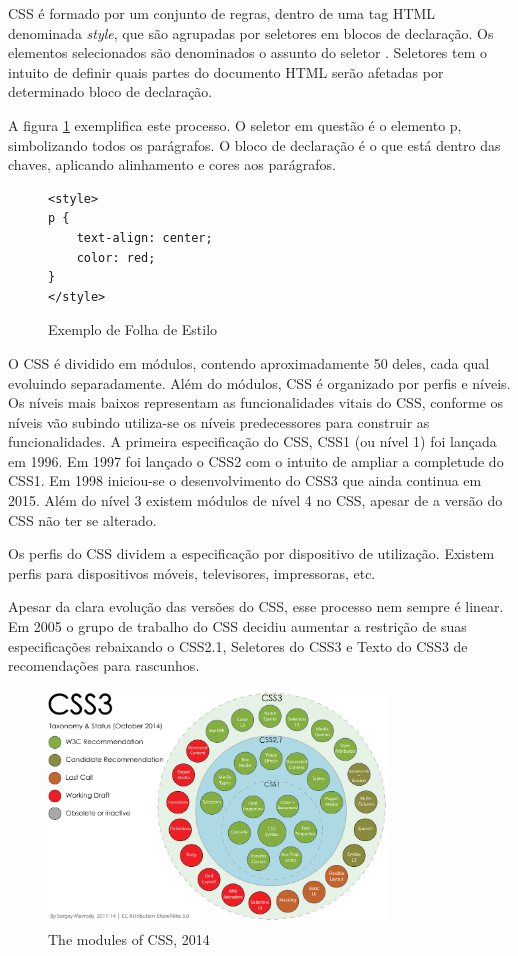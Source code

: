 \documentclass[
12pt,
a4paper,
portuges,
draft
]{report}
\begin{document}
CSS é formado por um conjunto de regras,
dentro de uma tag HTML denominada \textit{style}, que são agrupadas
por seletores em blocos de declaração. Os elementos selecionados são
denominados o assunto do seletor \autocite{cssSelectors}. Seletores tem
o intuito de definir quais partes do documento HTML serão afetadas por
determinado bloco de declaração.

A figura \ref{fig:CSSSample} exemplifica este processo. O seletor em
questão é o elemento p, simbolizando todos os parágrafos. O bloco de declaração
é o que está dentro das chaves, aplicando alinhamento e cores aos parágrafos.

\begin{figure}
\centering
\begin{verbatim}
<style>
p {
    text-align: center;
    color: red;
}
</style>
\end{verbatim}
\caption{Exemplo de Folha de Estilo}
\label{fig:CSSSample}
\end{figure}

O CSS é dividido em módulos, contendo aproximadamente 50 deles, cada
qual evoluindo separadamente. Além do módulos, CSS é organizado por perfis e níveis.
Os níveis mais baixos representam as funcionalidades vitais do CSS, conforme os níveis
vão subindo utiliza-se os níveis predecessores para construir as funcionalidades.
A primeira especificação do CSS, CSS1 (ou nível 1) foi lançada em 1996. Em 1997 foi lançado o
 CSS2 com o intuito de ampliar a completude do CSS1. Em 1998 iniciou-se o desenvolvimento
 do CSS3 que ainda continua em 2015. Além do nível 3 existem módulos de nível 4 no CSS, apesar de a
versão do CSS não ter se alterado.

Os perfis do CSS dividem a especificação por dispositivo de utilização. Existem perfis
para dispositivos móveis, televisores, impressoras, etc.

Apesar da clara evolução das versões do CSS, esse processo nem sempre é linear.
Em 2005 o grupo de trabalho do CSS decidiu aumentar a restrição de suas especificações
rebaixando o CSS2.1, Seletores do CSS3 e Texto do CSS3 de recomendações para rascunhos.

\begin{figure}
    \centering
    \includegraphics[width=0.8\textwidth,natwidth=610,natheight=642]{cssModules.png}
	\caption{The modules of CSS, 2014}
\end{figure}
\end{document}

